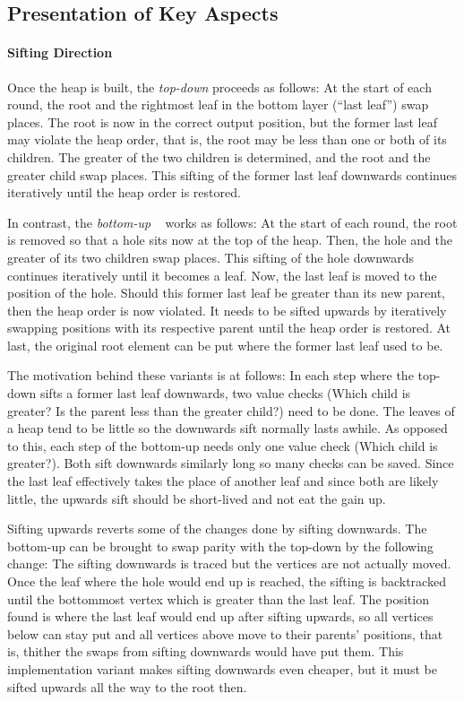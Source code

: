 \subsection{Presentation of Key Aspects}
\label{sec:tasklet:heap:aspects}

\paragraph{Sifting Direction}
Once the heap is built, the \emph{top-down} \HS{} proceeds as follows:
At the start of each round, the root and the rightmost leaf in the bottom layer (\enquote{last leaf}) swap places.
The root is now in the correct output position, but the former last leaf may violate the heap order, that is, the root may be less than one or both of its children.
The greater of the two children is determined, and the root and the greater child swap places.
This sifting of the former last leaf downwards continues iteratively until the heap order is restored.

In contrast, the \emph{bottom-up} \HS{}~\cite{wegener1993heapsort} works as follows:
At the start of each round, the root is removed so that a hole sits now at the top of the heap.
Then, the hole and the greater of its two children swap places.
This sifting of the hole downwards continues iteratively until it becomes a leaf.
Now, the last leaf is moved to the position of the hole.
Should this former last leaf be greater than its new parent, then the heap order is now violated.
It needs to be sifted upwards by iteratively swapping positions with its respective parent until the heap order is restored.
At last, the original root element can be put where the former last leaf used to be.

The motivation behind these variants is at follows:
In each step where the top-down \HS{} sifts a former last leaf downwards, two value checks (Which child is greater? Is the parent less than the greater child?) need to be done.
The leaves of a heap tend to be little so the downwards sift normally lasts awhile.
As opposed to this, each step of the bottom-up \HS{} needs only one value check (Which child is greater?).
Both \HS*{} sift downwards similarly long so many checks can be saved.
Since the last leaf effectively takes the place of another leaf and since both are likely little, the upwards sift should be short-lived and not eat the gain up.

Sifting upwards reverts some of the changes done by sifting downwards.
The bottom-up \HS{} can be brought to swap parity with the top-down \HS{} by the following change:
The sifting downwards is traced but the vertices are not actually moved.
Once the leaf where the hole would end up is reached, the sifting is backtracked until the bottommost vertex which is greater than the last leaf.
The position found is where the last leaf would end up after sifting upwards, so all vertices below can stay put and all vertices above move to their parents' positions, that is, thither the swaps from sifting downwards would have put them.
This implementation variant makes sifting downwards even cheaper, but it must be sifted upwards all the way to the root then.


